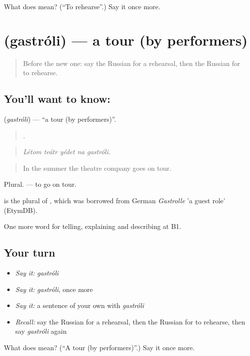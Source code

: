 \begin{tcolorbox}[breakable,colback=teal!4,colframe=teal!35!black,title={Before you move on}]
What does  mean? (\textquotedblleft{}To rehearse\textquotedblright{}.) Say it once more.
\end{tcolorbox}
\section[\texorpdfstring{\ru{гастроли} (gastróli)}{гастроли (gastróli)}]{ (gastróli) — a tour (by performers)}

\label{lesson:RU-C518-gastroli}



\begin{quote}
Before the new one: say the Russian for a rehearsal, then the Russian for to rehearse.
\end{quote}

\subsection*{You'll want to know: }
\textbf{} (\emph{gastróli}) — \textquotedblleft{}a tour (by performers)\textquotedblright{}.

\begin{quote}
    .
\end{quote}

\begin{quote}
\emph{Létom teátr yédet na gastróli.}
\end{quote}

\begin{quote}
In the summer the theatre company goes on tour.
\end{quote}

Plural. \emph{  } — to go on tour.

\begin{cousinweb}
\emph{} is the plural of \emph{}, which was borrowed from German \emph{Gastrolle} 'a guest role' (EtymDB).
\end{cousinweb}

\begin{grammarlens}[title={What you've built}]
One more word for telling, explaining and describing at B1.
\end{grammarlens}

\subsection*{Your turn}
\begin{itemize}
\raggedright
  \item \emph{Say it:} \emph{gastróli}
  \item \emph{Say it:} \emph{gastróli}, once more
  \item \emph{Say it:} a sentence of your own with \emph{gastróli}
  \item \emph{Recall:} say the Russian for a rehearsal, then the Russian for to rehearse, then say \emph{gastróli} again
\end{itemize}

\begin{tcolorbox}[breakable,colback=teal!4,colframe=teal!35!black,title={Before you move on}]
What does  mean? (\textquotedblleft{}A tour (by performers)\textquotedblright{}.) Say it once more.
\end{tcolorbox}
